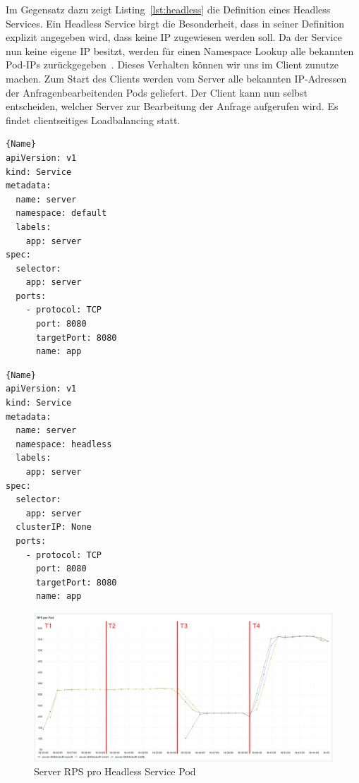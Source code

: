 Im Gegensatz dazu zeigt Listing~\ref{lst:headless} die Definition eines Headless Services.
Ein Headless Service birgt die Besonderheit, dass in seiner Definition explizit angegeben wird, dass keine IP zugewiesen werden soll.
Da der Service nun keine eigene IP besitzt, werden für einen Namespace Lookup alle bekannten Pod-IPs zurückgegeben~\cite{kubernetesNetworking}.
Dieses Verhalten können wir uns im Client zunutze machen.
Zum Start des Clients werden vom Server alle bekannten IP-Adressen der Anfragenbearbeitenden Pods geliefert.
Der Client kann nun selbst entscheiden, welcher Server zur Bearbeitung der Anfrage aufgerufen wird.
Es findet clientseitiges Loadbalancing statt.

\noindent\begin{minipage}{.45\textwidth}
             \begin{lstlisting}[caption=Standard Service,frame=tlrb,label={lst:standard}]{Name}
apiVersion: v1
kind: Service
metadata:
  name: server
  namespace: default
  labels:
    app: server
spec:
  selector:
    app: server
  ports:
    - protocol: TCP
      port: 8080
      targetPort: 8080
      name: app
             \end{lstlisting}
\end{minipage}\hfill
\begin{minipage}{.45\textwidth}
    \begin{lstlisting}[caption=Headless Service,frame=tlrb,label={lst:headless}]{Name}
apiVersion: v1
kind: Service
metadata:
  name: server
  namespace: headless
  labels:
    app: server
spec:
  selector:
    app: server
  clusterIP: None
  ports:
    - protocol: TCP
      port: 8080
      targetPort: 8080
      name: app
    \end{lstlisting}
\end{minipage}

\begin{figure}[H]
    \centering
    \includegraphics[width=1\textwidth]{img/headless_rps}
    \caption{Server RPS pro Headless Service Pod}
    \label{fig:headless_rps}
\end{figure}

